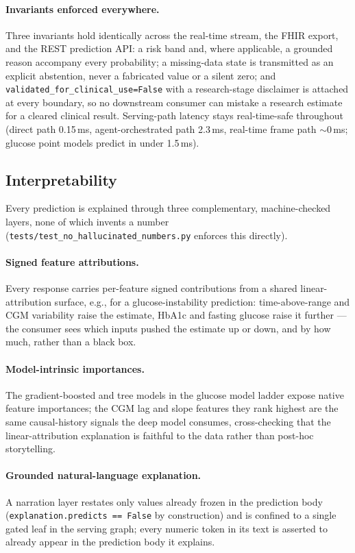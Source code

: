 \paragraph{Invariants enforced everywhere.} Three invariants hold identically across the real-time
stream, the FHIR export, and the REST prediction API: a risk band and, where applicable, a grounded
reason accompany every probability; a missing-data state is transmitted as an explicit abstention,
never a fabricated value or a silent zero; and \texttt{validated\_for\_clinical\_use=False} with a
research-stage disclaimer is attached at every boundary, so no downstream consumer can mistake a
research estimate for a cleared clinical result. Serving-path latency stays real-time-safe
throughout (direct path 0.15\,ms, agent-orchestrated path 2.3\,ms, real-time frame path
${\sim}$0\,ms; glucose point models predict in under 1.5\,ms).

\subsection{Interpretability}
\label{subsec:interpret}
Every prediction is explained through three complementary, machine-checked layers, none of which
invents a number (\texttt{tests/test\_no\_hallucinated\_numbers.py} enforces this directly).

\paragraph{Signed feature attributions.} Every response carries per-feature signed contributions
from a shared linear-attribution surface, e.g., for a glucose-instability prediction: time-above-range
and CGM variability raise the estimate, HbA1c and fasting glucose raise it further --- the
consumer sees which inputs pushed the estimate up or down, and by how much, rather than a black
box.

\paragraph{Model-intrinsic importances.} The gradient-boosted and tree models in the glucose model
ladder expose native feature importances; the CGM lag and slope features they rank highest are the
same causal-history signals the deep model consumes, cross-checking that the linear-attribution
explanation is faithful to the data rather than post-hoc storytelling.

\paragraph{Grounded natural-language explanation.} A narration layer restates only values already
frozen in the prediction body (\texttt{explanation.predicts == False} by construction) and is
confined to a single gated leaf in the serving graph; every numeric token in its text is asserted
to already appear in the prediction body it explains.

